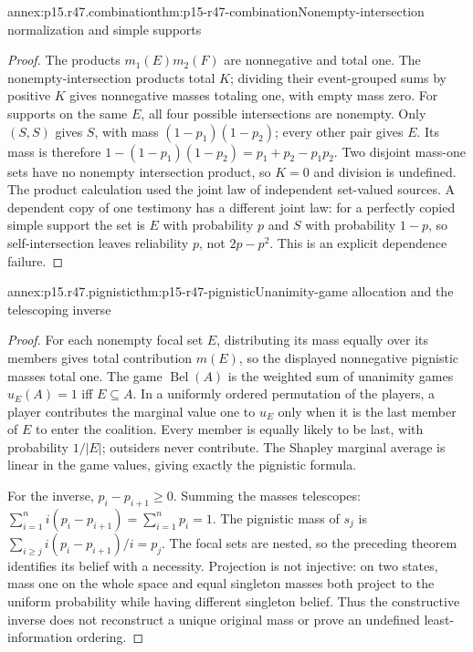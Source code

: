 \begin{annexitem}{annex:p15.r47.combination}{thm:p15-r47-combination}{Nonempty-intersection normalization and simple supports}
\begin{proof}
The products \(m_1(E)m_2(F)\) are nonnegative and total one. The
nonempty-intersection products total \(K\); dividing their event-grouped
sums by positive \(K\) gives nonnegative masses totaling one, with empty
mass zero. For supports on the same \(E\), all four possible intersections
are nonempty. Only \((S,S)\) gives \(S\), with mass
\((1-p_1)(1-p_2)\); every other pair gives \(E\). Its mass is therefore
\(1-(1-p_1)(1-p_2)=p_1+p_2-p_1p_2\). Two disjoint mass-one sets have
no nonempty intersection product, so \(K=0\) and division is undefined.
The product calculation used the joint law of independent set-valued
sources. A dependent copy of one testimony has a different joint law:
for a perfectly copied simple support the set is \(E\) with probability
\(p\) and \(S\) with probability \(1-p\), so self-intersection leaves
reliability \(p\), not \(2p-p^2\). This is an explicit dependence failure.
\end{proof}\end{annexitem}

\begin{annexitem}{annex:p15.r47.pignistic}{thm:p15-r47-pignistic}{Unanimity-game allocation and the telescoping inverse}
\begin{proof}
For each nonempty focal set \(E\), distributing its mass equally over
its members gives total contribution \(m(E)\), so the displayed
nonnegative pignistic masses total one. The game
\(\operatorname{Bel}(A)\) is the weighted sum of unanimity games
\(u_E(A)=1\) iff \(E\subseteq A\). In a uniformly ordered permutation
of the players, a player contributes the marginal value one to \(u_E\)
only when it is the last member of \(E\) to enter the coalition.
Every member is equally likely to be last, with probability \(1/|E|\);
outsiders never contribute. The Shapley marginal average is linear in
the game values, giving exactly the pignistic formula.

For the inverse, \(p_i-p_{i+1}\geq0\). Summing the masses telescopes:
\(\sum_{i=1}^n i(p_i-p_{i+1})=\sum_{i=1}^np_i=1\).
The pignistic mass of \(s_j\) is
\(\sum_{i\geq j}i(p_i-p_{i+1})/i=p_j\).
The focal sets are nested, so the preceding theorem identifies its
belief with a necessity. Projection is not injective: on two states,
mass one on the whole space and equal singleton masses both project
to the uniform probability while having different singleton belief.
Thus the constructive inverse does not reconstruct a unique original
mass or prove an undefined least-information ordering.
\end{proof}\end{annexitem}

